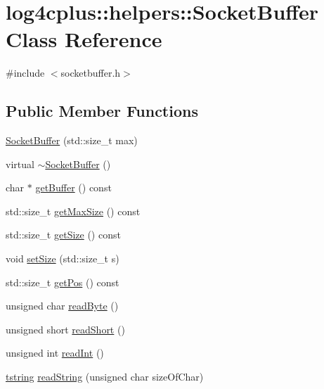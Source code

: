 \hypertarget{classlog4cplus_1_1helpers_1_1SocketBuffer}{\section{log4cplus\-:\-:helpers\-:\-:Socket\-Buffer Class Reference}
\label{classlog4cplus_1_1helpers_1_1SocketBuffer}
}


{\ttfamily \#include $<$socketbuffer.\-h$>$}

\subsection*{Public Member Functions}
\begin{DoxyCompactItemize}
\item 
\hyperlink{classlog4cplus_1_1helpers_1_1SocketBuffer_a3bbfb994dc6a273475c072fbf77a3887}{Socket\-Buffer} (std\-::size\-\_\-t max)
\item 
virtual \hyperlink{classlog4cplus_1_1helpers_1_1SocketBuffer_aae6cff778032678983ce2766a0f6793a}{$\sim$\-Socket\-Buffer} ()
\item 
char $\ast$ \hyperlink{classlog4cplus_1_1helpers_1_1SocketBuffer_a03039ac378aaa1bf7823cc2ab9753cba}{get\-Buffer} () const 
\item 
std\-::size\-\_\-t \hyperlink{classlog4cplus_1_1helpers_1_1SocketBuffer_aa939f09960e221d8edd0a641fa6ef6a3}{get\-Max\-Size} () const 
\item 
std\-::size\-\_\-t \hyperlink{classlog4cplus_1_1helpers_1_1SocketBuffer_ae423797523886e38f7532bb83b4a3a20}{get\-Size} () const 
\item 
void \hyperlink{classlog4cplus_1_1helpers_1_1SocketBuffer_a0b6da7af4b06de85db6f26ad15e7b128}{set\-Size} (std\-::size\-\_\-t s)
\item 
std\-::size\-\_\-t \hyperlink{classlog4cplus_1_1helpers_1_1SocketBuffer_aa24928f56dc3ace9b2a66e2bd5d30e72}{get\-Pos} () const 
\item 
unsigned char \hyperlink{classlog4cplus_1_1helpers_1_1SocketBuffer_a90f60f72bbcc468eaa70f8e5dce3622f}{read\-Byte} ()
\item 
unsigned short \hyperlink{classlog4cplus_1_1helpers_1_1SocketBuffer_aac133b8ae65dc281ed017ef547a6de7f}{read\-Short} ()
\item 
unsigned int \hyperlink{classlog4cplus_1_1helpers_1_1SocketBuffer_aa0cab6e84c9f73abe799c7193a50b3af}{read\-Int} ()
\item 
\hyperlink{namespacelog4cplus_a3c9287f6ebcddc50355e29d71152117b}{tstring} \hyperlink{classlog4cplus_1_1helpers_1_1SocketBuffer_a50f50fabbc107643111e3f74f5377d7d}{read\-String} (unsigned char size\-Of\-Char)

\end{DoxyCompactItemize}
